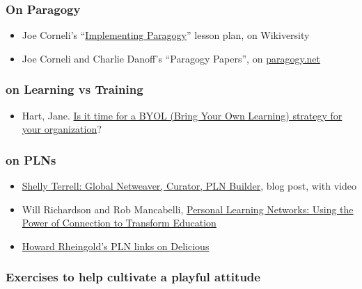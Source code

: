 \subsubsection{On Paragogy}

\begin{itemize}
\item
  Joe Corneli's
  ``\href{http://en.wikiversity.org/wiki/User:Arided/ImplementingParagogy}{Implementing
  Paragogy}'' lesson plan, on Wikiversity
\item
  Joe Corneli and Charlie Danoff's ``Paragogy Papers'', on
  \href{paragogy.net}{paragogy.net}
\end{itemize}

\subsubsection{on Learning vs Training}

\begin{itemize}
\item
  Hart, Jane.
  \href{http://www.c4lpt.co.uk/blog/2012/04/20/is-it-time-for-a-byol-bring-your-own-learning-strategy-in-your-organization-byol/}{Is
  it time for a BYOL (Bring Your Own Learning) strategy for your
  organization}?
\end{itemize}

\subsubsection{on PLNs}

\begin{itemize}
\item
  \href{http://dmlcentral.net/blog/howard-rheingold/shelly-terrell-global-netweaver-curator-pln-builder}{Shelly
  Terrell: Global Netweaver, Curator, PLN Builder}, blog post, with
  video
\item
  Will Richardson and Rob Mancabelli,
  \href{http://weblogg-ed.com/2011/personal-learning-networks-an-excerpt/}{Personal
  Learning Networks: Using the Power of Connection to Transform
  Education}
\item
  \href{http://delicious.com/hrheingold/pln}{Howard Rheingold's PLN
  links on Delicious}
\end{itemize}

\subsubsection{Exercises to help cultivate a playful attitude}


